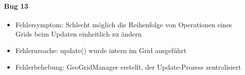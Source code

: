 \paragraph{Bug 13}
\begin{itemize}
	\item Fehlersymptom: Schlecht möglich die Reihenfolge von Operationen eines Grids beim Updaten einheitlich zu ändern
	\item Fehlerursache: update() wurde intern im Grid ausgeführt
	\item Fehlerbehebung: GeoGridManager erstellt, der Update-Prozess zentralisiert
\end{itemize}